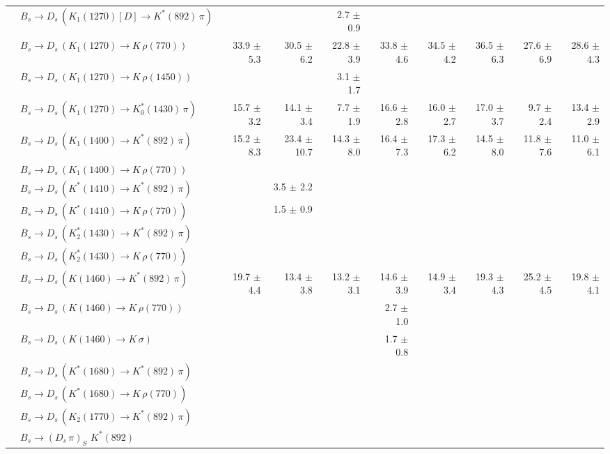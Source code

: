 \begin{tabular}{l l  r  r  r  r  r  r  r  r  }
 & $B_s \to D_s \, ( K_1(1270)[D] \to K^{*}(892) \, \pi )$ &  &  & 2.7 $\pm$ 0.9 &  &  &  &  &  \\ 
 & $B_s \to D_s \, ( K_1(1270) \to K \, \rho(770) )$ & 33.9 $\pm$ 5.3 & 30.5 $\pm$ 6.2 & 22.8 $\pm$ 3.9 & 33.8 $\pm$ 4.6 & 34.5 $\pm$ 4.2 & 36.5 $\pm$ 6.3 & 27.6 $\pm$ 6.9 & 28.6 $\pm$ 4.3 \\ 
 & $B_s \to D_s \, ( K_1(1270) \to K \, \rho(1450) )$ &  &  & 3.1 $\pm$ 1.7 &  &  &  &  &  \\ 
 & $B_s \to D_s \, ( K_1(1270) \to K^{*}_{0}(1430) \, \pi )$ & 15.7 $\pm$ 3.2 & 14.1 $\pm$ 3.4 & 7.7 $\pm$ 1.9 & 16.6 $\pm$ 2.8 & 16.0 $\pm$ 2.7 & 17.0 $\pm$ 3.7 & 9.7 $\pm$ 2.4 & 13.4 $\pm$ 2.9 \\ 
 & $B_s \to D_s \, ( K_1(1400) \to K^{*}(892) \, \pi )$ & 15.2 $\pm$ 8.3 & 23.4 $\pm$ 10.7 & 14.3 $\pm$ 8.0 & 16.4 $\pm$ 7.3 & 17.3 $\pm$ 6.2 & 14.5 $\pm$ 8.0 & 11.8 $\pm$ 7.6 & 11.0 $\pm$ 6.1 \\ 
 & $B_s \to D_s \, ( K_1(1400) \to K \, \rho(770) )$ &  &  &  &  &  &  &  &  \\ 
 & $B_s \to D_s \, ( K^{*}(1410) \to K^{*}(892) \, \pi )$ &  & 3.5 $\pm$ 2.2 &  &  &  &  &  &  \\ 
 & $B_s \to D_s \, ( K^{*}(1410) \to K \, \rho(770) )$ &  & 1.5 $\pm$ 0.9 &  &  &  &  &  &  \\ 
 & $B_s \to D_s \, ( K_2^{*}(1430) \to K^{*}(892) \, \pi )$ &  &  &  &  &  &  &  &  \\ 
 & $B_s \to D_s \, ( K_2^{*}(1430) \to K \, \rho(770) )$ &  &  &  &  &  &  &  &  \\ 
 & $B_s \to D_s \, ( K(1460) \to K^{*}(892) \, \pi )$ & 19.7 $\pm$ 4.4 & 13.4 $\pm$ 3.8 & 13.2 $\pm$ 3.1 & 14.6 $\pm$ 3.9 & 14.9 $\pm$ 3.4 & 19.3 $\pm$ 4.3 & 25.2 $\pm$ 4.5 & 19.8 $\pm$ 4.1 \\ 
 & $B_s \to D_s \, ( K(1460) \to K \, \rho(770) )$ &  &  &  & 2.7 $\pm$ 1.0 &  &  &  &  \\ 
 & $B_s \to D_s \, ( K(1460) \to K \, \sigma )$ &  &  &  & 1.7 $\pm$ 0.8 &  &  &  &  \\ 
 & $B_s \to D_s \, ( K^{*}(1680) \to K^{*}(892) \, \pi )$ &  &  &  &  &  &  &  &  \\ 
 & $B_s \to D_s \, ( K^{*}(1680) \to K \, \rho(770) )$ &  &  &  &  &  &  &  &  \\ 
 & $B_s \to D_s \, ( K_2(1770) \to K^{*}(892) \, \pi )$ &  &  &  &  &  &  &  &  \\ 
 & $B_s \to ( D_s \, \pi)_{S} \, \, K^{*}(892)$ &  &  &  &  &  &  &  &  \\ 

\end{tabular}
